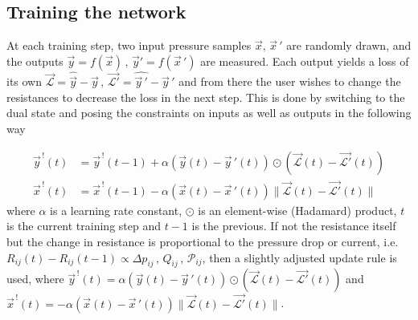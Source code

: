 \documentclass[%
 reprint,
 amsmath,amssymb,
 aps,
]{revtex4-2}
\begin{document}
\subsection{Training the network}\label{sec:training}

    At each training step, two input pressure samples $\vec{x},\,\vec{x}\,'$ are randomly drawn, and the outputs $\vec{y}=f\left(\vec{x}\right)\,,\,\vec{y}'=f\left(\vec{x}\,'\right)$ are measured. Each output yields a loss of its own $\vec{\mathcal{L}}=\widehat{\vec{y}}-\vec{y}\,,\,\vec{\mathcal{L}'}=\widehat{\vec{y}\,'}-\vec{y}\,'$ and from there the user wishes to change the resistances to decrease the loss in the next step. 
    This is done by switching to the dual state and posing the constraints on inputs as well as outputs in the following way


    \begin{align}
    \vec{y}^{\,!}\left(t\right) &= \vec{y}^{\,!}\left(t-1\right)
    +  \alpha\left(\vec{y}\left(t\right)-\vec{y}\,'\left(t\right)\right) 
    \odot \left(\vec{\mathcal{L}}\left(t\right)-\vec{\mathcal{L}'}\left(t\right)\right) \label{eq:dual_values_x} \\
    \vec{x}^{\,!}\left(t\right) &=  \vec{x}^{\,!}\left(t-1\right)
    - \alpha\left(\vec{x}\left(t\right)-\vec{x}\,'\left(t\right)\right) 
    \|\vec{\mathcal{L}}\left(t\right)-\vec{\mathcal{L}'}\left(t\right)\| \label{eq:dual_values_p}
    \end{align}
    where $\alpha$ is a learning rate constant, $ \odot$ is an element-wise (Hadamard) product, $t$ is the current training step and $t-1$ is the previous. 
    If not the resistance itself but the change in resistance is proportional to the pressure drop or current, i.e. 
    $R_{ij}\left(t\right) - R_{ij}\left(t-1\right) \propto \Delta p_{ij} \, , \,Q_{ij}\, , \, \mathcal{P}_{ij}$, 
    then a slightly adjusted update rule is used, where
    $\vec{y}^{\,!}\left(t\right) = \alpha\left(\vec{y}\left(t\right)-\vec{y}\,'\left(t\right)\right)\odot\left(\vec{\mathcal{L}}\left(t\right)-\vec{\mathcal{L}'}\left(t\right)\right)$ 
    and 
    $\vec{x}^{\,!}\left(t\right) = -\alpha\left(\vec{x}\left(t\right)-\vec{x}\,'\left(t\right)\right)\|\vec{\mathcal{L}}\left(t\right)-\vec{\mathcal{L}'}\left(t\right)\|$.
    
\end{document}
